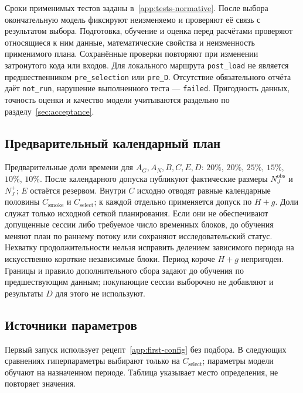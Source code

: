 \documentclass[12pt,a4paper]{article}
\newcommand{\code}[1]{{\ttfamily\small\nolinkurl{#1}}}
\theoremstyle{plainru}
\begin{document}
Сроки применимых тестов заданы в~\ref{app:tests-normative}.
После выбора окончательную модель фиксируют неизменяемо
и проверяют её связь с результатом выбора.
Подготовка, обучение и оценка перед расчётами проверяют относящиеся
к ним данные, математические свойства и неизменность применимого плана.
Сохранённые проверки повторяют при изменении затронутого кода или входов.
Для локального маршрута \code{post_load} не является предшественником
\code{pre_selection} или \code{pre_D}.
Отсутствие обязательного отчёта
даёт \code{not_run}, нарушение выполненного теста --- \code{failed}.
Пригодность данных, точность оценки и качество модели учитываются
раздельно по разделу~\ref{sec:acceptance}.

\subsection{Предварительный календарный план}

Предварительные доли времени для $A_G,A_N,B,C,E,D$:
$20\%$, $20\%$, $25\%$, $15\%$, $10\%$, $10\%$.
После календарного допуска публикуют фактические размеры
$N_J^{\mathrm{obs}}$ и $N_J^+$; $E$ остаётся резервом.
Внутри $C$ исходно отводят равные календарные половины
$C_{\mathrm{smoke}}$ и $C_{\mathrm{select}}$; к каждой отдельно применяется
допуск по $H+g$. Доли служат только исходной сеткой планирования.
Если они не обеспечивают допущенные сессии либо требуемое число временных
блоков, до обучения меняют план по раннему потоку или сохраняют
исследовательский статус. Нехватку продолжительности нельзя исправить
делением зависимого периода на искусственно короткие независимые блоки.
Период короче $H+g$ непригоден. Границы и правило дополнительного
сбора задают до обучения по предшествующим данным; покупающие сессии
выборочно не добавляют и результаты $D$ для этого не используют.


\subsection{Источники параметров}\label{app:parameter-roles}

Первый запуск использует рецепт~\ref{app:first-config} без подбора.
В следующих сравнениях гиперпараметры выбирают только на
$C_{\mathrm{select}}$; параметры модели обучают на назначенном периоде.
Таблица указывает место определения, не повторяет значения.
\end{document}
